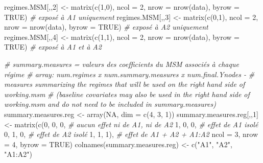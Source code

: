 \documentclass[
]{book}
\newenvironment{Shaded}{\begin{snugshade}}{\end{snugshade}}
\newcommand{\AttributeTok}[1]{\textcolor[rgb]{0.77,0.63,0.00}{#1}}
\newcommand{\CommentTok}[1]{\textcolor[rgb]{0.56,0.35,0.01}{\textit{#1}}}
\newcommand{\ConstantTok}[1]{\textcolor[rgb]{0.00,0.00,0.00}{#1}}
\newcommand{\DecValTok}[1]{\textcolor[rgb]{0.00,0.00,0.81}{#1}}
\newcommand{\FunctionTok}[1]{\textcolor[rgb]{0.00,0.00,0.00}{#1}}
\newcommand{\NormalTok}[1]{#1}
\newcommand{\OtherTok}[1]{\textcolor[rgb]{0.56,0.35,0.01}{#1}}
\newcommand{\StringTok}[1]{\textcolor[rgb]{0.31,0.60,0.02}{#1}}
\begin{document}
\begin{Shaded}
\begin{Highlighting}[]
\NormalTok{  regimes.MSM[,,}\DecValTok{2}\NormalTok{] }\OtherTok{\textless{}{-}} \FunctionTok{matrix}\NormalTok{(}\FunctionTok{c}\NormalTok{(}\DecValTok{1}\NormalTok{,}\DecValTok{0}\NormalTok{), }\AttributeTok{ncol =} \DecValTok{2}\NormalTok{, }\AttributeTok{nrow =} \FunctionTok{nrow}\NormalTok{(data), }\AttributeTok{byrow =} \ConstantTok{TRUE}\NormalTok{) }\CommentTok{\# exposé à A1 uniquement}
\NormalTok{  regimes.MSM[,,}\DecValTok{3}\NormalTok{] }\OtherTok{\textless{}{-}} \FunctionTok{matrix}\NormalTok{(}\FunctionTok{c}\NormalTok{(}\DecValTok{0}\NormalTok{,}\DecValTok{1}\NormalTok{), }\AttributeTok{ncol =} \DecValTok{2}\NormalTok{, }\AttributeTok{nrow =} \FunctionTok{nrow}\NormalTok{(data), }\AttributeTok{byrow =} \ConstantTok{TRUE}\NormalTok{) }\CommentTok{\# exposé à A2 uniquement}
\NormalTok{  regimes.MSM[,,}\DecValTok{4}\NormalTok{] }\OtherTok{\textless{}{-}} \FunctionTok{matrix}\NormalTok{(}\FunctionTok{c}\NormalTok{(}\DecValTok{1}\NormalTok{,}\DecValTok{1}\NormalTok{), }\AttributeTok{ncol =} \DecValTok{2}\NormalTok{, }\AttributeTok{nrow =} \FunctionTok{nrow}\NormalTok{(data), }\AttributeTok{byrow =} \ConstantTok{TRUE}\NormalTok{) }\CommentTok{\# exposé à A1 et à A2}

  \CommentTok{\# summary.measures = valeurs des coefficients du MSM associés à chaque régime}
  \CommentTok{\# array: num.regimes x num.summary.measures x num.final.Ynodes {-}}
  \CommentTok{\# measures summarizing the regimes that will be used on the right hand side of working.msm}
  \CommentTok{\# (baseline covariates may also be used in the right hand side of working.msm and do not need to be included in summary.measures)}
\NormalTok{  summary.measures.reg }\OtherTok{\textless{}{-}} \FunctionTok{array}\NormalTok{(}\ConstantTok{NA}\NormalTok{, }\AttributeTok{dim =} \FunctionTok{c}\NormalTok{(}\DecValTok{4}\NormalTok{, }\DecValTok{3}\NormalTok{, }\DecValTok{1}\NormalTok{))}
\NormalTok{  summary.measures.reg[,,}\DecValTok{1}\NormalTok{] }\OtherTok{\textless{}{-}} \FunctionTok{matrix}\NormalTok{(}\FunctionTok{c}\NormalTok{(}\DecValTok{0}\NormalTok{, }\DecValTok{0}\NormalTok{, }\DecValTok{0}\NormalTok{, }\CommentTok{\# aucun effet ni de A1, ni de A2}
                                        \DecValTok{1}\NormalTok{, }\DecValTok{0}\NormalTok{, }\DecValTok{0}\NormalTok{, }\CommentTok{\# effet de A1 isolé}
                                        \DecValTok{0}\NormalTok{, }\DecValTok{1}\NormalTok{, }\DecValTok{0}\NormalTok{, }\CommentTok{\# effet de A2 isolé}
                                        \DecValTok{1}\NormalTok{, }\DecValTok{1}\NormalTok{, }\DecValTok{1}\NormalTok{), }\CommentTok{\# effet de A1 + A2 + A1:A2}
                                      \AttributeTok{ncol =} \DecValTok{3}\NormalTok{, }\AttributeTok{nrow =} \DecValTok{4}\NormalTok{, }\AttributeTok{byrow =} \ConstantTok{TRUE}\NormalTok{)}
  \FunctionTok{colnames}\NormalTok{(summary.measures.reg) }\OtherTok{\textless{}{-}} \FunctionTok{c}\NormalTok{(}\StringTok{"A1"}\NormalTok{, }\StringTok{"A2"}\NormalTok{, }\StringTok{"A1:A2"}\NormalTok{)}


\end{Highlighting}
\end{Shaded}
\end{document}
